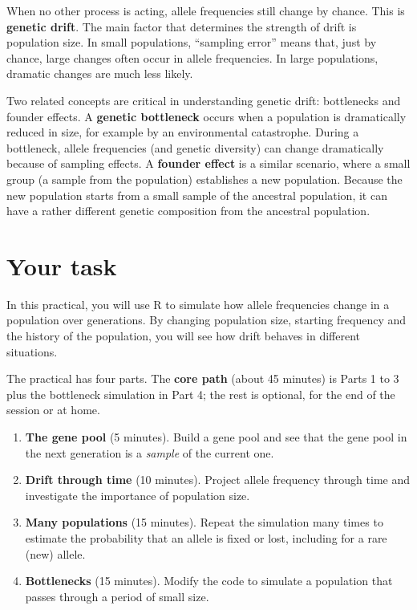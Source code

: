 \documentclass[
  a4paper]{book}
\providecommand{\tightlist}{%
  \setlength{\itemsep}{0pt}\setlength{\parskip}{0pt}}
\begin{document}
When no other process is acting, allele frequencies still change by chance. This is \textbf{genetic drift}. The main factor that determines the strength of drift is population size. In small populations, ``sampling error'' means that, just by chance, large changes often occur in allele frequencies. In large populations, dramatic changes are much less likely.

Two related concepts are critical in understanding genetic drift: bottlenecks and founder effects. A \textbf{genetic bottleneck} occurs when a population is dramatically reduced in size, for example by an environmental catastrophe. During a bottleneck, allele frequencies (and genetic diversity) can change dramatically because of sampling effects. A \textbf{founder effect} is a similar scenario, where a small group (a sample from the population) establishes a new population. Because the new population starts from a small sample of the ancestral population, it can have a rather different genetic composition from the ancestral population.

\section{Your task}\label{your-task-15}

In this practical, you will use R to simulate how allele frequencies change in a population over generations. By changing population size, starting frequency and the history of the population, you will see how drift behaves in different situations.

The practical has four parts. The \textbf{core path} (about 45 minutes) is Parts 1 to 3 plus the bottleneck simulation in Part 4; the rest is optional, for the end of the session or at home.

\begin{enumerate}
\def\labelenumi{\arabic{enumi}.}
\tightlist
\item
  \textbf{The gene pool} (5 minutes). Build a gene pool and see that the gene pool in the next generation is a \emph{sample} of the current one.
\item
  \textbf{Drift through time} (10 minutes). Project allele frequency through time and investigate the importance of population size.
\item
  \textbf{Many populations} (15 minutes). Repeat the simulation many times to estimate the probability that an allele is fixed or lost, including for a rare (new) allele.
\item
  \textbf{Bottlenecks} (15 minutes). Modify the code to simulate a population that passes through a period of small size.
\end{enumerate}
\end{document}
